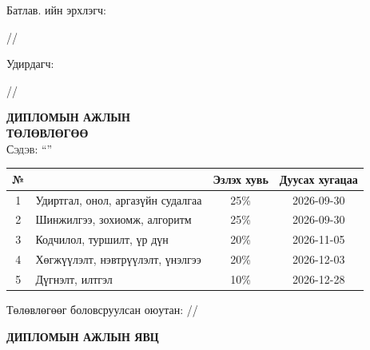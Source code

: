
\begin{titlepage}

\vspace*{0.5cm}
Батлав. \deptname{}ийн эрхлэгч: 
\begin{flushright}
\makebox[4cm]{\dotfill} /\chairname/ 
\end{flushright}

Удирдагч: 
\begin{flushright}
\makebox[4cm]{\dotfill} /\supname/
\end{flushright}

\begin{center}

\vspace*{2cm}
\textbf{{\large ДИПЛОМЫН АЖЛЫН \\ ТӨЛӨВЛӨГӨӨ}}\\[0.5cm]
\textsc{\large Сэдэв: ``\ttitle''}\\[0.5cm]

\begin{tabular}{|c|p{7cm}|c|c|}
	\hline
	№ & \makebox[7cm][c]{Ажлын бүлэг, хэсгийн нэр} & Эзлэх хувь & Дуусах хугацаа \\ \hline
	1 & {Удиртгал, онол, аргазүйн судалгаа} & 25\% & 2026-09-30 \\ \hline
	2 & {Шинжилгээ, зохиомж, алгоритм}      & 25\% & 2026-09-30 \\ \hline
	3 & {Кодчилол, туршилт, үр дүн}         & 20\% & 2026-11-05 \\ \hline
	4 & {Хөгжүүлэлт, нэвтрүүлэлт, үнэлгээ}  & 20\% & 2026-12-03 \\ \hline
	5 & {Дүгнэлт, илтгэл}                  & 10\% & 2026-12-28 \\ \hline
\end{tabular}

\vspace{2cm}
Төлөвлөгөөг боловсруулсан оюутан: \makebox[3cm]{\dotfill} /\shortname/

\end{center}

\newpage

\begin{center}

\vspace*{2cm}
\textbf{{\large ДИПЛОМЫН АЖЛЫН ЯВЦ}}\\[0.5cm]


\end{center}
\end{titlepage}
